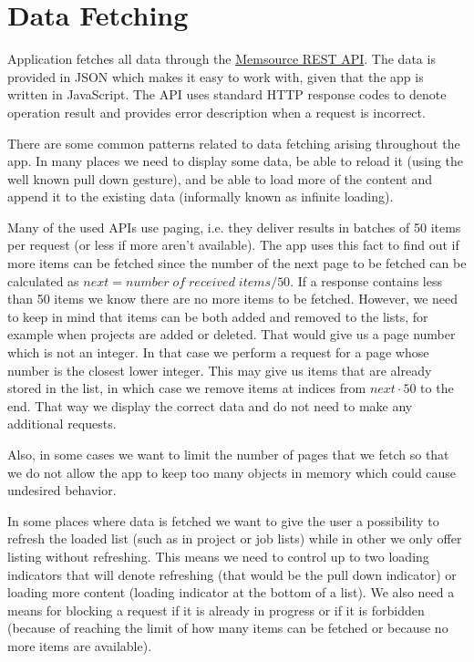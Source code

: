 \section{Data Fetching}

Application fetches all data through the \href{http://wiki.memsource.com/wiki/Memsource_API#API_Reference}{Memsource REST API}. The data is provided in JSON which makes it easy to work with, given that the app is written in JavaScript. The API uses standard HTTP response codes to denote operation result and provides error description when a request is incorrect.

There are some common patterns related to data fetching arising throughout the app. In many places we need to display some data, be able to reload it (using the well known pull down gesture), and be able to load more of the content and append it to the existing data (informally known as infinite loading).

Many of the used APIs use paging, i.e. they deliver results in batches of 50 items per request (or less if more aren't available). The app uses this fact to find out if more items can be fetched since the number of the next page to be fetched can be calculated as $next = number \;of\; received \;items / 50$. If a response contains less than 50 items we know there are no more items to be fetched. However, we need to keep in mind that items can be both added and removed to the lists, for example when projects are added or deleted. That would give us a page number which is not an integer. In that case we perform a request for a page whose number is the closest lower integer. This may give us items that are already stored in the list, in which case we remove items at indices from $next \cdot 50$ to the end. That way we display the correct data and do not need to make any additional requests.

Also, in some cases we want to limit the number of pages that we fetch so that we do not allow the app to keep too many objects in memory which could cause undesired behavior. 

In some places where data is fetched we want to give the user a possibility to refresh the loaded list (such as in project or job lists) while in other we only offer listing without refreshing. This means we need to control up to two loading indicators that will denote refreshing (that would be the pull down indicator) or loading more content (loading indicator at the bottom of a list). We also need a means for blocking a request if it is already in progress or if it is forbidden (because of reaching the limit of how many items can be fetched or because no more items are available). 

